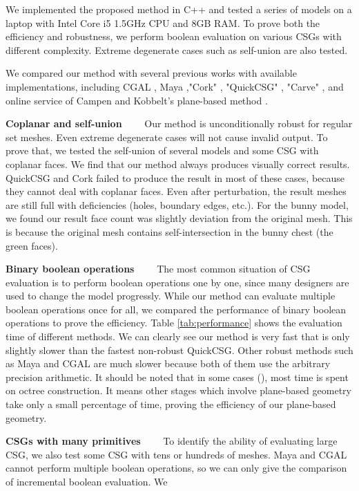 \documentclass[10pt,journal,compsoc]{IEEEtran}
\begin{document}
We implemented the proposed method in C++ and tested a series of models on a laptop with Intel Core i5 1.5GHz CPU and 8GB RAM. To prove both the efficiency and robustness, we perform boolean evaluation on various CSGs with different complexity. Extreme degenerate cases such as self-union are also tested.

We compared our method with several previous works with available implementations, including CGAL \cite{cgal:hk-bonp3-15a}, Maya \cite{Maya2015,barki2015exact},"Cork" \cite{Cork}, "QuickCSG" \cite{douze2015quickcsg}, "Carve" \cite{Carve}, and online service of Campen and Kobbelt's plane-based method \cite{campen2010exact,WebBSP}.


\vspace{0.5em}
\noindent\textbf{Coplanar and self-union}~~~~
Our method is unconditionally robust for regular set meshes. Even extreme degenerate cases will not cause invalid output. To prove that, we tested the self-union of several models and some CSG with coplanar faces. We find that our method always produces visually correct results. QuickCSG and Cork failed to produce the result in most of these cases, because they cannot deal with coplanar faces. Even after perturbation, the result meshes are still full with deficiencies (holes, boundary edges, etc.). For the bunny model, we found our result face count was slightly deviation from the original mesh. This is because the original mesh contains self-intersection in the bunny chest (the green faces).

\vspace{0.5em}
\noindent\textbf{Binary boolean operations}~~~~
The most common situation of CSG evaluation is to perform boolean operations one by one, since many designers are used to change the model progressly. While our method can evaluate multiple boolean operations once for all, we compared the performance of binary boolean operations to prove the efficiency. Table \ref{tab:performance} shows the evaluation time of different methods. We can clearly see our method is very fast that is only slightly slower than the fastest non-robust QuickCSG. Other robust methods such as Maya and CGAL are much slower because both of them use the arbitrary precision arithmetic. It should be noted that in some cases (), most time is spent on octree construction. It means other stages which involve plane-based geometry take only a small percentage of time, proving the efficiency of our plane-based geometry.


\vspace{0.5em}
\noindent\textbf{CSGs with many primitives}~~~~
To identify the ability of evaluating large CSG, we also test some CSG with tens or hundreds of meshes. Maya and CGAL cannot perform multiple boolean operations, so we can only give the comparison of incremental boolean evaluation. We 
\end{document}
